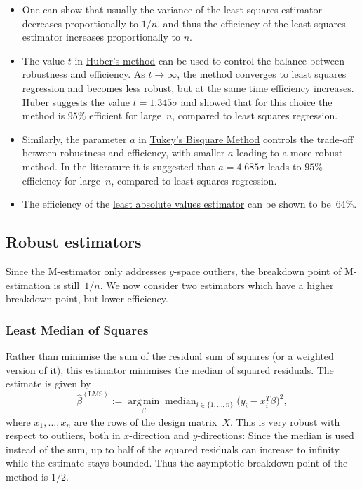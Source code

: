 \documentclass[
  a4paper,
]{article}
\theoremstyle{definition}
\theoremstyle{definition}
\theoremstyle{definition}
\theoremstyle{definition}
\theoremstyle{remark}
\begin{document}
\begin{itemize}
\item
  One can show that usually the variance of the least squares
  estimator decreases proportionally to \(1 / n\), and thus the efficiency of
  the least squares estimator increases proportionally to \(n\).
\item
  The value \(t\) in \protect\hyperlink{Huber}{Huber's method} can be used to control
  the balance between robustness and efficiency. As \(t\to\infty\),
  the method converges to least squares regression and becomes
  less robust, but at the same time efficiency increases.
  Huber suggests the value \(t = 1.345\sigma\) and showed that for this
  choice the method is \(95\%\) efficient for large~\(n\), compared
  to least squares regression.
\item
  Similarly, the parameter \(a\) in \protect\hyperlink{tukeys-bisquare-method}{Tukey's Bisquare Method} controls
  the trade-off between robustness and efficiency, with smaller \(a\) leading
  to a more robust method. In the literature it is suggested that
  \(a = 4.685 \sigma\) leads to \(95\%\) efficiency for large~\(n\), compared to
  least squares regression.
\item
  The efficiency of the \protect\hyperlink{LAV}{least absolute values estimator} can be shown
  to be~\(64\%\).
\end{itemize}

\hypertarget{robust-estimators}{%
\subsection{Robust estimators}\label{robust-estimators}}

Since the M-estimator only addresses \(y\)-space outliers, the breakdown point
of M-estimation is still~\(1/n\). We now consider two estimators which have a
higher breakdown point, but lower efficiency.

\hypertarget{least-median-of-squares}{%
\subsubsection{Least Median of Squares}\label{least-median-of-squares}}

Rather than minimise the sum of the residual sum of squares (or a weighted
version of it), this estimator minimises the median of squared residuals. The
estimate is given by
\begin{equation*}
  \hat\beta^\mathrm{(LMS)}
  := \mathop{\mathrm{arg\,min}}\limits_\beta \mathop{\mathrm{median}}_{i\in\{1,\ldots,n\}} \bigl( y_i- x_i^T \beta \bigr)^2,
\end{equation*}
where \(x_1, \ldots, x_n\) are the rows of the design matrix~\(X\).
This is very robust with respect to outliers, both in \(x\)-direction and
\(y\)-directions: Since the median is used instead of the sum, up to half
of the squared residuals can increase to infinity while the estimate stays
bounded. Thus the asymptotic breakdown point of the method is \(1/2\).
\end{document}
